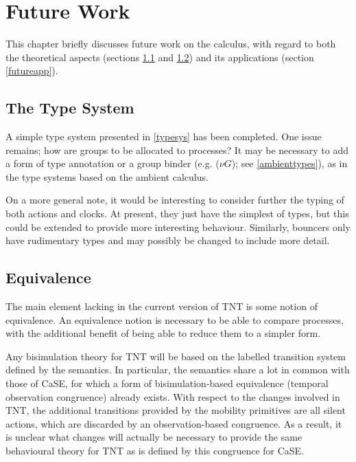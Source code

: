 \chapter{Future Work}
\label{futurework}

This chapter briefly discusses future work on the calculus, with regard
to both the theoretical aspects (sections \ref{futuretypes} and
\ref{futureequiv}) and its applications (section \ref{futureapp}).

\section{The Type System}
\label{futuretypes}

A simple type system presented in \ref{typesys} has been completed.
One issue remains; how are groups to be allocated to processes?  It may be
necessary to add a form of type annotation or a group binder (e.g. ($\nu
G$); see \ref{ambienttypes}), as in the type systems based on the
ambient calculus.

On a more general note, it would be interesting to consider further the
typing of both actions and clocks.  At present, they just have the
simplest of types, but this could be extended to provide more
interesting behaviour.  Similarly, bouncers only have rudimentary types
and may possibly be changed to include more detail.

\section{Equivalence}
\label{futureequiv}

The main element lacking in the current version of TNT is some notion of
equivalence.  An equivalence notion is necessary to be able to compare
processes, with the additional benefit of being able to reduce them to a
simpler form.

Any bisimulation theory for TNT will be based on the labelled transition
system defined by the semantics.  In particular, the semantics share a
lot in common with those of CaSE, for which a form of bisimulation-based
equivalence (temporal observation congruence) already exists.  With
respect to the changes involved in TNT, the additional transitions
provided by the mobility primitives are all silent actions, which are
discarded by an observation-based congruence.  As a result, it is
unclear what changes will actually be necessary to provide the same
behavioural theory for TNT as is defined by this congruence for CaSE.

